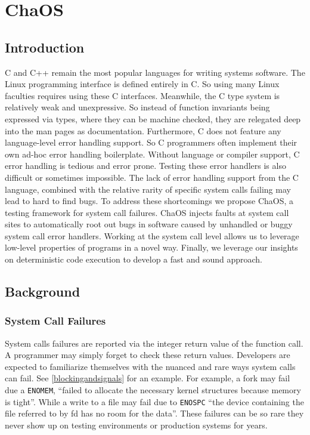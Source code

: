 
\section{ChaOS}

\subsection{Introduction}
C and C++ remain the most popular languages for writing systems software. The Linux programming interface is defined entirely in C. So using many Linux faculties requires using these C interfaces. Meanwhile, the C type system is relatively weak and unexpressive. So instead of function invariants being expressed via types, where they can be machine checked, they are relegated deep into the man pages as documentation. Furthermore, C does not feature any language-level error handling support. So C programmers often implement their own ad-hoc error handling boilerplate. Without language or compiler support, C error handling is tedious and error prone. Testing these error handlers is also difficult or sometimes impossible. The lack of error handling support from the C language, combined with the relative rarity of specific system calls failing may lead to hard to find bugs.
To address these shortcomings we propose ChaOS, a testing framework for system call failures. ChaOS injects faults at system call sites to automatically root out bugs in software caused by unhandled or buggy system call error handlers.
Working at the system call level allows us to leverage low-level properties of programs in a novel way. Finally, we leverage our insights on deterministic code execution to develop a fast and sound approach.

\subsection{Background}

\subsubsection{System Call Failures}

System calls failures are reported via the integer return value of the function call. A programmer may simply forget to check these return values. Developers are expected to familiarize themselves with the nuanced and rare ways system calls can fail. See \ref{blockingandsignals} for an example. For example, a fork may fail due a \texttt{ENOMEM}, ``failed to allocate the necessary kernel structures because memory is tight''. While a write to a file may fail due to \texttt{ENOSPC} ``the device containing the file referred to by fd has no room for the data''. These failures can be so rare they never show up on testing environments or production systems for years.

